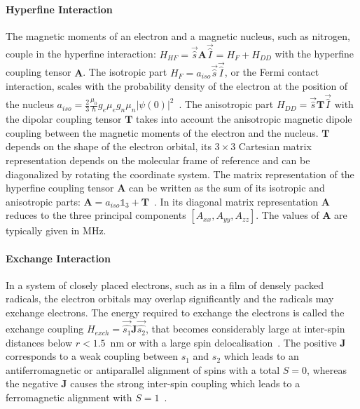 \paragraph*{Hyperfine Interaction}
The magnetic moments of an electron and a magnetic nucleus, such as nitrogen, couple in the hyperfine interaction: $H_{HF}=\vec{\hat{s}}\textbf{A}\vec{\hat{I}}=H_F+H_{DD}$ with the hyperfine coupling tensor $\textbf{A}$. The isotropic part $H_F=a_{iso}\vec{\hat{s}}\vec{\hat{I}}$, or the Fermi contact interaction, scales with the probability density of the electron at the position of the nucleus $a_{iso}=\frac{2}{3}\frac{\mu_0}{\hbar}g_e\mu_eg_n\mu_n\vert\psi(0)\vert^2$~\cite{Schweiger2001}. The anisotropic part $H_{DD}=\vec{\hat{s}}\textbf{T}\vec{\hat{I}}$ with the dipolar coupling tensor $\textbf{T}$ takes into account the anisotropic magnetic dipole coupling between the magnetic moments of the electron and the nucleus. $\textbf{T}$ depends on the shape of the electron orbital, its $3\times3$ Cartesian matrix representation depends on the molecular frame of reference and can be diagonalized by rotating the coordinate system. The matrix representation of the hyperfine coupling tensor $\textbf{A}$ can be written as the sum of its isotropic and anisotropic parts: $\textbf{A}=a_{iso}\mathds{1}_3 + \textbf{T}$~\cite{Weil_Bolton}. In its diagonal matrix representation $\textbf{A}$ reduces to the three principal components $[A_{xx}, A_{yy}, A_{zz}]$. The values of $\textbf{A}$ are typically given in MHz.

\paragraph*{Exchange Interaction}
In a system of closely placed electrons, such as in a film of densely packed radicals, the electron orbitals may overlap significantly and the radicals may exchange electrons. The energy required to exchange the electrons is called the exchange coupling $H_{exch} = \vec{\hat{s_1}}\textbf{J}\vec{\hat{s_2}}$, that becomes considerably large at inter-spin distances below $r<1.5$~nm or with a large spin delocalisation~\cite{Schweiger2001}. The positive $\textbf{J}$ corresponds to a weak coupling between $s_1$ and $s_2$ which leads to an antiferromagnetic or antiparallel alignment of spins with a total $S=0$, whereas the negative $\textbf{J}$ causes the strong inter-spin coupling which leads to a ferromagnetic alignment with $S=1$~\cite{Schweiger2001}.\\


